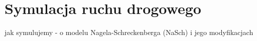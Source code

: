 \chapter{Symulacja ruchu drogowego}
\label{chap:symulacja}
jak symulujemy - o modelu Nagela-Schreckenberga (NaSch) i jego modyfikacjach